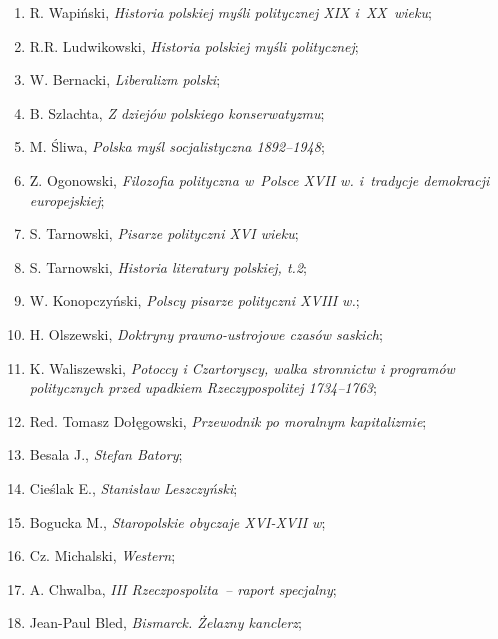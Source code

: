 \documentclass[a4paper,11pt]{article}
\begin{document}
\begin{enumerate}
\item R. Wapiński, \textit{Historia polskiej myśli politycznej XIX
    i~XX~wieku};

\item R.R. Ludwikowski, \textit{Historia polskiej myśli politycznej};

\item W. Bernacki, \textit{Liberalizm polski};

\item B. Szlachta, \textit{Z dziejów polskiego konserwatyzmu};

\item M. Śliwa, \textit{Polska myśl socjalistyczna 1892--1948};

\item Z. Ogonowski, \textit{Filozofia polityczna w~Polsce XVII w.
    i~tradycje demokracji europejskiej};

\item S. Tarnowski, \textit{Pisarze polityczni XVI wieku};

\item S. Tarnowski, \textit{Historia literatury polskiej, t.2};

\item W. Konopczyński, \textit{Polscy pisarze polityczni XVIII w.};

\item H. Olszewski, \textit{Doktryny prawno-ustrojowe czasów saskich};

\item K. Waliszewski, \textit{Potoccy i Czartoryscy, walka stronnictw i
    programów politycznych przed upadkiem Rzeczypospolitej 1734--1763};

\item Red. Tomasz Dołęgowski, \textit{Przewodnik po moralnym
    kapitalizmie};

\item Besala J., \textit{Stefan Batory};

\item Cieślak E., \textit{Stanisław Leszczyński};

\item Bogucka M., \textit{Staropolskie obyczaje XVI-XVII w};

\item Cz. Michalski, \textit{Western};

\item A. Chwalba, \textit{III Rzeczpospolita~-- raport specjalny};

\item Jean-Paul Bled, \textit{Bismarck. Żelazny kanclerz};


\end{enumerate}
\end{document}
